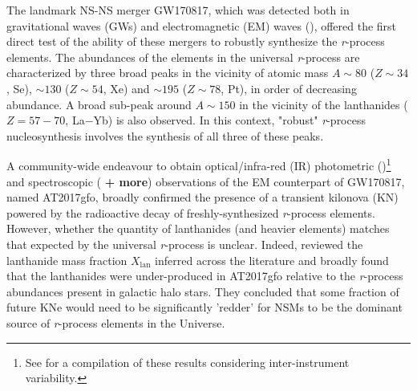 \documentclass[twocolumn]{aastex63}
\begin{document}
The landmark NS-NS merger GW170817, which was detected both in gravitational waves (GWs) and electromagnetic (EM) waves (\citealt{abbottLIGO17a}), offered the first direct test of the ability of these mergers to robustly synthesize the \textit{r}-process elements. The abundances of the elements in the universal \textit{r}-process are characterized by three broad peaks in the vicinity of atomic mass $A\sim80$ ($Z\sim34$, Se), $\sim130$ ($Z\sim54$, Xe) and $\sim195$ ($Z\sim78$, Pt), in order of decreasing abundance. A broad sub-peak around $A\sim150$ in the vicinity of the lanthanides ($Z=57-70$, La$-$Yb) is also observed. In this context, "robust" \textit{r}-process nucleosynthesis involves the synthesis of all three of these peaks. 

A community-wide endeavour to obtain optical/infra-red (IR) photometric (\citealt{andreoni17, arcavi17, coulter17, diaz17, drout17, evans17, hu17, kasliwal17, lipunov17, shappee17, tanvir17, troja17, utsumi17, valenti17})\footnote{See \cite{villar17} for a compilation of these results considering inter-instrument variability.} and spectroscopic (\citealt{chornock17, kasen17, pian17, smartt17, cote18} \textbf{+ more}) observations of the EM counterpart of GW170817, named AT2017gfo, broadly confirmed the presence of a transient kilonova (KN) powered by the radioactive decay of freshly-synthesized \textit{r}-process elements. However, whether the quantity of lanthanides (and heavier elements) matches that expected by the universal \textit{r}-process is unclear. Indeed, \cite{ji19} reviewed the lanthanide mass fraction $X_{\mathrm{lan}}$ inferred across the literature and broadly found that the lanthanides were under-produced in AT2017gfo relative to the \textit{r}-process abundances present in galactic halo stars. They concluded that some fraction of future KNe would need to be significantly 'redder' for NSMs to be the dominant source of \textit{r}-process elements in the Universe. 
\end{document}

